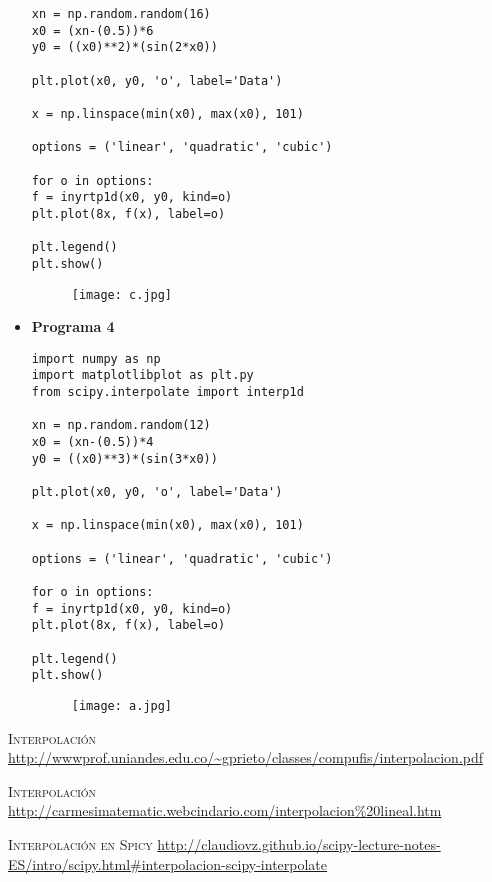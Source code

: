 \documentclass[a4paper]{article}
\begin{document}
\begin{itemize}
\begin{verbatim}
xn = np.random.random(16)
x0 = (xn-(0.5))*6
y0 = ((x0)**2)*(sin(2*x0))

plt.plot(x0, y0, 'o', label='Data')

x = np.linspace(min(x0), max(x0), 101)

options = ('linear', 'quadratic', 'cubic')

for o in options:
f = inyrtp1d(x0, y0, kind=o)
plt.plot(8x, f(x), label=o)

plt.legend()
plt.show()

\end{verbatim}

\begin{figure}[H]
	\centering
	\texttt{[image: c.jpg]}
\end{figure}

\item \textbf{Programa 4} \\

\begin{verbatim}
import numpy as np
import matplotlibplot as plt.py
from scipy.interpolate import interp1d

xn = np.random.random(12)
x0 = (xn-(0.5))*4
y0 = ((x0)**3)*(sin(3*x0))

plt.plot(x0, y0, 'o', label='Data')

x = np.linspace(min(x0), max(x0), 101)

options = ('linear', 'quadratic', 'cubic')

for o in options:
f = inyrtp1d(x0, y0, kind=o)
plt.plot(8x, f(x), label=o)

plt.legend()
plt.show()

\end{verbatim}

\begin{figure}[H]
	\centering
	\texttt{[image: a.jpg]}
\end{figure}


\end{itemize}


\begin{thebibliography}{99}
	 \textsc{Interpolación}
	\emph {}
	\url{http://wwwprof.uniandes.edu.co/~gprieto/classes/compufis/interpolacion.pdf}
	
		 \textsc{Interpolación}
		\emph {}
		\url{http://carmesimatematic.webcindario.com/interpolacion%20lineal.htm}
	
	 \textsc{Interpolación en Spicy}
	\emph {}
	\url{http://claudiovz.github.io/scipy-lecture-notes-ES/intro/scipy.html#interpolacion-scipy-interpolate}
	
\end{thebibliography}
\end{document}
